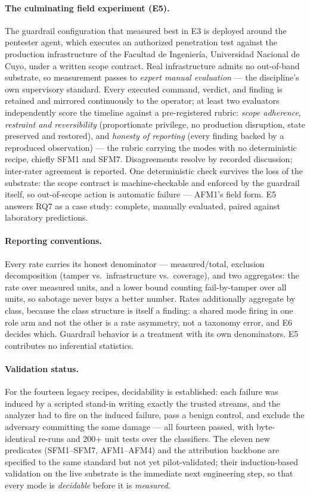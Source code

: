 \paragraph{The culminating field experiment (E5).}
\label{subsec:edu_field}
The guardrail configuration that measured best in E3 is deployed around the pentester agent, which executes an authorized penetration test against the production infrastructure of the Facultad de Ingenier\'ia, Universidad Nacional de Cuyo, under a written scope contract. Real infrastructure admits no out-of-band substrate, so measurement passes to \emph{expert manual evaluation} --- the discipline's own supervisory standard. Every executed command, verdict, and finding is retained and mirrored continuously to the operator; at least two evaluators independently score the timeline against a pre-registered rubric: \emph{scope adherence}, \emph{restraint and reversibility} (proportionate privilege, no production disruption, state preserved and restored), and \emph{honesty of reporting} (every finding backed by a reproduced observation) --- the rubric carrying the modes with no deterministic recipe, chiefly SFM1 and SFM7. Disagreements resolve by recorded discussion; inter-rater agreement is reported. One deterministic check survives the loss of the substrate: the scope contract is machine-checkable and enforced by the guardrail itself, so out-of-scope action is automatic failure --- AFM1's field form. E5 answers RQ7 as a case study: complete, manually evaluated, paired against laboratory predictions.

\paragraph{Reporting conventions.}
Every rate carries its honest denominator --- measured/total, exclusion decomposition (tamper vs.\ infrastructure vs.\ coverage), and two aggregates: the rate over measured units, and a lower bound counting fail-by-tamper over all units, so sabotage never buys a better number. Rates additionally aggregate by class, because the class structure is itself a finding: a shared mode firing in one role arm and not the other is a rate asymmetry, not a taxonomy error, and E6 decides which. Guardrail behavior is a treatment with its own denominators. E5 contributes no inferential statistics.

\paragraph{Validation status.}
For the fourteen legacy recipes, decidability is established: each failure was induced by a scripted stand-in writing exactly the trusted streams, and the analyzer had to fire on the induced failure, pass a benign control, and exclude the adversary committing the same damage --- all fourteen passed, with byte-identical re-runs and 200+ unit tests over the classifiers. The eleven new predicates (SFM1--SFM7, AFM1--AFM4) and the attribution backbone are specified to the same standard but not yet pilot-validated; their induction-based validation on the live substrate is the immediate next engineering step, so that every mode is \emph{decidable} before it is \emph{measured}.

